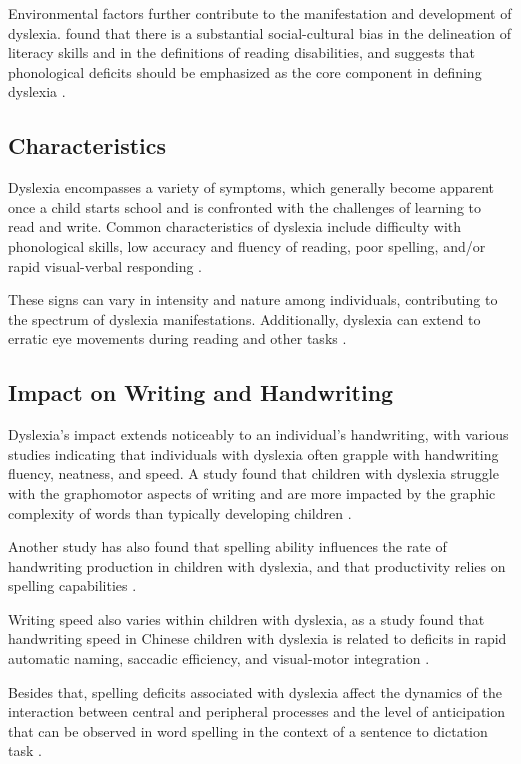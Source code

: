 Environmental factors further contribute to the manifestation and development of dyslexia. found that there is a substantial social-cultural bias in the delineation of literacy skills and in the definitions of reading disabilities, and suggests that phonological deficits should be emphasized as the core component in defining dyslexia \parencite{Samuelsson2003}.

\newpage
\subsection{Characteristics}
Dyslexia encompasses a variety of symptoms, which generally become apparent once a child starts school and is confronted with the challenges of learning to read and write. Common characteristics of dyslexia include difficulty with phonological skills, low accuracy and fluency of reading, poor spelling, and/or rapid visual-verbal responding \parencite{Roitsch2019}. 

These signs can vary in intensity and nature among individuals, contributing to the spectrum of dyslexia manifestations. Additionally, dyslexia can extend to erratic eye movements during reading and other tasks \parencite{Pavlidis1981}.

\subsection{Impact on Writing and Handwriting}
Dyslexia's impact extends noticeably to an individual's handwriting, with various studies indicating that individuals with dyslexia often grapple with handwriting fluency, neatness, and speed. A study found that children with dyslexia struggle with the graphomotor aspects of writing and are more impacted by the graphic complexity of words than typically developing children \parencite{Gosse2020}. 

Another study has also found that spelling ability influences the rate of handwriting production in children with dyslexia, and that productivity relies on spelling capabilities \parencite{Sumner2014}.

Writing speed also varies within children with dyslexia, as a study found that handwriting speed in Chinese children with dyslexia is related to deficits in rapid automatic naming, saccadic efficiency, and visual-motor integration \parencite{ChengLai2013}. 

Besides that, spelling deficits associated with dyslexia affect the dynamics of the interaction between central and peripheral processes and the level of anticipation that can be observed in word spelling in the context of a sentence to dictation task \parencite{SurezCoalla2020}.

